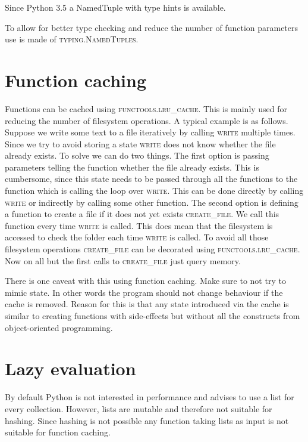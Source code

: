 Since Python 3.5 a NamedTuple with type hints is available.

To allow for better type checking and reduce the number of function parameters use is made of \textsc{typing.NamedTuples}.


\section{Function caching}
\label{sec:function_caching}
Functions can be cached using \textsc{functools.lru\_cache}.
This is mainly used for reducing the number of filesystem operations.
A typical example is as follows.
Suppose we write some text to a file iteratively by calling \textsc{write} multiple times.
Since we try to avoid storing a state \textsc{write} does not know whether the file already exists.
To solve we can do two things.
The first option is passing parameters telling the function whether the file already exists.
This is cumbersome, since this state needs to be passed through all the functions to the function which is calling the loop over \textsc{write}.
This can be done directly by calling \textsc{write} or indirectly by calling some other function.
The second option is defining a function to create a file if it does not yet exists \textsc{create\_file}.
We call this function every time \textsc{write} is called.
This does mean that the filesystem is accessed to check the folder each time \textsc{write} is called.
To avoid all those filesystem operations \textsc{create\_file} can be decorated using \textsc{functools.lru\_cache}.
Now on all but the first calls to \textsc{create\_file} just query memory.

There is one caveat with this using function caching.
Make sure to not try to mimic state.
In other words the program should not change behaviour if the cache is removed.
Reason for this is that any state introduced via the cache is similar to creating functions with side-effects but without all the constructs from object-oriented programming.

\section{Lazy evaluation}
\label{sec:lazy_evaluation}
By default Python is not interested in performance and advises to use a list for every collection.
However, lists are mutable and therefore not suitable for hashing.
Since hashing is not possible any function taking lists as input is not suitable for function caching.

